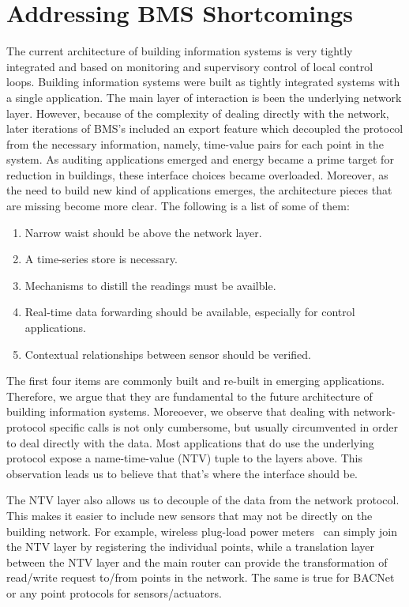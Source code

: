 
\section{Addressing BMS Shortcomings}
The current architecture of building information systems is very tightly integrated and based on monitoring and supervisory control
of local control loops.  Building information systems were built as tightly integrated systems with a single application.  The main
layer of interaction is been the underlying network layer.  However, because of the complexity of dealing directly with the network,
later iterations of BMS's included an export feature which decoupled the protocol from the necessary information, namely, time-value
pairs for each point in the system.  As auditing applications emerged and energy became a prime target for reduction in buildings, 
these interface choices became overloaded.  Moreover, as the need to build new kind of applications emerges, the architecture pieces
that are missing become more clear.  The following is a list of some of them:

\begin{enumerate}
\item Narrow waist should be above the network layer.
\item A time-series store is necessary.
\item Mechanisms to distill the readings must be availble.
\item Real-time data forwarding should be available, especially for control applications.
\item Contextual relationships between sensor should be verified.
\end{enumerate}

The first four items are commonly built and re-built in emerging applications.  Therefore, we argue that they are fundamental 
to the future architecture of building information systems.  Moreoever, we observe that dealing with network-protocol specific
calls is not only cumbersome, but usually circumvented in order to deal directly with the data.  Most applications that do
use the underlying protocol expose a name-time-value (NTV) tuple to the layers above.  This observation leads us to believe that
that's where the interface should be.

The NTV layer also allows us to decouple of the data from the network protocol.  This makes it easier to include 
new sensors that may not be directly on the building network.  For example, wireless plug-load power meters~\cite{ACme}
can simply join the NTV layer by registering the individual points, while a translation layer between the NTV layer and the
main router can provide the transformation of read/write request to/from points in the network.  The same is true for BACNet
or any point protocols for sensors/actuators.

